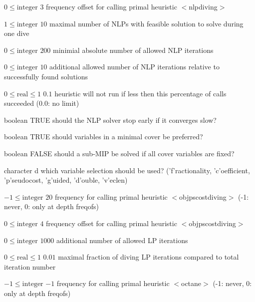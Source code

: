 %
{$0\leq\textrm{integer}$}%
{$3$}%
{frequency offset for calling primal heuristic $<$nlpdiving$>$}%
{}

%
{$1\leq\textrm{integer}$}%
{$10$}%
{maximal number of NLPs with feasible solution to solve during one dive}%
{}

%
{$0\leq\textrm{integer}$}%
{$200$}%
{minimial absolute number of allowed NLP iterations}%
{}

%
{$0\leq\textrm{integer}$}%
{$10$}%
{additional allowed number of NLP iterations relative to successfully found solutions}%
{}

%
{$0\leq\textrm{real}\leq1$}%
{$0.1$}%
{heuristic will not run if less then this percentage of calls succeeded (0.0: no limit)}%
{}

%
{boolean}%
{TRUE}%
{should the NLP solver stop early if it converges slow?}%
{}

%
{boolean}%
{TRUE}%
{should variables in a minimal cover be preferred?}%
{}

%
{boolean}%
{FALSE}%
{should a sub-MIP be solved if all cover variables are fixed?}%
{}

%
{character}%
{d}%
{which variable selection should be used? ('f'ractionality, 'c'oefficient, 'p'seudocost, 'g'uided, 'd'ouble, 'v'eclen)}%
{}

%
{$-1\leq\textrm{integer}$}%
{$20$}%
{frequency for calling primal heuristic $<$objpscostdiving$>$ (-1: never, 0: only at depth freqofs)}%
{}

%
{$0\leq\textrm{integer}$}%
{$4$}%
{frequency offset for calling primal heuristic $<$objpscostdiving$>$}%
{}

%
{$0\leq\textrm{integer}$}%
{$1000$}%
{additional number of allowed LP iterations}%
{}

%
{$0\leq\textrm{real}\leq1$}%
{$0.01$}%
{maximal fraction of diving LP iterations compared to total iteration number}%
{}

%
{$-1\leq\textrm{integer}$}%
{$-1$}%
{frequency for calling primal heuristic $<$octane$>$ (-1: never, 0: only at depth freqofs)}%
{}

